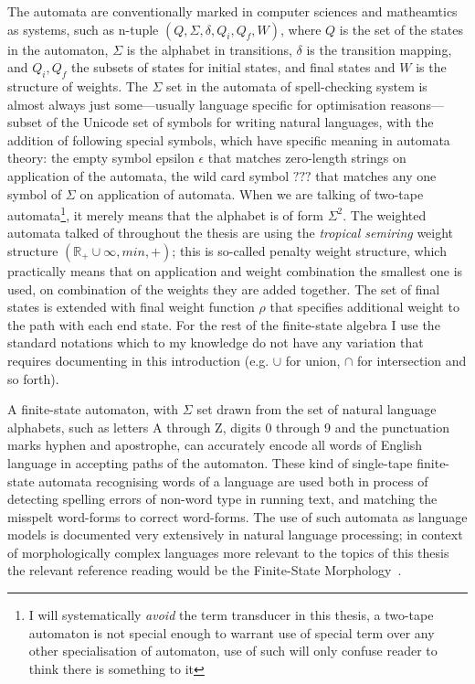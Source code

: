 \documentclass[officiallayout]{unihelcompling}
\begin{document}
The automata are conventionally marked in computer sciences and matheamtics as
systems, such as n-tuple $(Q, \Sigma, \delta, Q_i, Q_f, W)$, where $Q$ is the
set of the states in the automaton, $\Sigma$ is the alphabet in transitions,
$\delta$ is the transition mapping, and $Q_i, Q_f$ the subsets of states for
initial states, and final states and $W$ is the structure of weights. The
$\Sigma$ set in the automata of spell-checking system is almost always just
some---usually language specific for optimisation reasons---subset of the
Unicode set of symbols for writing natural languages, with the addition of
following special symbols, which have specific meaning in automata theory: the
empty symbol epsilon $\epsilon$ that matches zero-length strings on application
of the automata, the wild card symbol $???$ that matches any one symbol of $\Sigma$ on application of automata.  When
we are talking of two-tape automata\footnote{I will systematically \emph{avoid}
    the term transducer in this thesis, a two-tape automaton is not special
enough to warrant use of special term over any other specialisation of
automaton, use of such will only confuse reader to think there is something to
it}, it merely means that the alphabet is of form $\Sigma^2$. The weighted
automata talked of throughout the thesis are using the \emph{tropical semiring}
weight structure $(\mathbb{R}_+ \cup \infty, min, +)$; this is so-called
penalty weight structure, which practically means that on application and
weight combination the smallest one is used, on combination of the weights they
are added together. The set of final states is extended with final weight
function $\rho$ that specifies additional weight to the path with each end 
state. For the rest of the finite-state algebra I use the standard notations
which to my knowledge do not have any variation that requires documenting in
this introduction (e.g. $\cup$ for union, $\cap$ for intersection and so forth).

A finite-state automaton, with $\Sigma$ set drawn from the set of natural
language alphabets, such as letters A through Z, digits 0 through 9 and the
punctuation marks hyphen and apostrophe, can accurately encode all words of
English language in accepting paths of the automaton. These kind of single-tape
finite-state automata recognising words of a language are used both in process
of detecting spelling errors of non-word type in running text, and matching
the misspelt word-forms to correct word-forms. The use of such automata as
language models is documented very extensively in natural language processing;
in context of morphologically complex languages more relevant to the topics of
this thesis the relevant reference reading would be the Finite-State Morphology~\citep{beesley2003finite,beesley2004morphological}.
\end{document}
